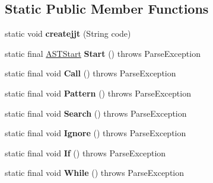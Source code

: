 \subsection*{Static Public Member Functions}
\begin{DoxyCompactItemize}
\item 
static void {\bfseries createjjt} (String code)\hypertarget{classpack_1_1_my_new_grammar_a1d22472648daa2428b8819d9350fe0ba}{}\label{classpack_1_1_my_new_grammar_a1d22472648daa2428b8819d9350fe0ba}

\item 
static final \hyperlink{classpack_1_1_a_s_t_start}{A\+S\+T\+Start} {\bfseries Start} ()  throws Parse\+Exception \hypertarget{classpack_1_1_my_new_grammar_af645bef1a2157e8ebd69e7b4fa391175}{}\label{classpack_1_1_my_new_grammar_af645bef1a2157e8ebd69e7b4fa391175}

\item 
static final void {\bfseries Call} ()  throws Parse\+Exception \hypertarget{classpack_1_1_my_new_grammar_a25dc4ec87cf88cdcbabf76bf42b81bf0}{}\label{classpack_1_1_my_new_grammar_a25dc4ec87cf88cdcbabf76bf42b81bf0}

\item 
static final void {\bfseries Pattern} ()  throws Parse\+Exception \hypertarget{classpack_1_1_my_new_grammar_a8ec581f80ea72879508c5d06c5e06d21}{}\label{classpack_1_1_my_new_grammar_a8ec581f80ea72879508c5d06c5e06d21}

\item 
static final void {\bfseries Search} ()  throws Parse\+Exception \hypertarget{classpack_1_1_my_new_grammar_aa2e5773c817abe2cc290a81b021bb406}{}\label{classpack_1_1_my_new_grammar_aa2e5773c817abe2cc290a81b021bb406}

\item 
static final void {\bfseries Ignore} ()  throws Parse\+Exception \hypertarget{classpack_1_1_my_new_grammar_aa7047a0e659b1bed6e10a950bde2df26}{}\label{classpack_1_1_my_new_grammar_aa7047a0e659b1bed6e10a950bde2df26}

\item 
static final void {\bfseries If} ()  throws Parse\+Exception \hypertarget{classpack_1_1_my_new_grammar_afbe31a8cc781ac522042d997139ab5f6}{}\label{classpack_1_1_my_new_grammar_afbe31a8cc781ac522042d997139ab5f6}

\item 
static final void {\bfseries While} ()  throws Parse\+Exception \hypertarget{classpack_1_1_my_new_grammar_a681fbf675864f8ced7c7dfa18fecba2b}{}\label{classpack_1_1_my_new_grammar_a681fbf675864f8ced7c7dfa18fecba2b}


\end{DoxyCompactItemize}
